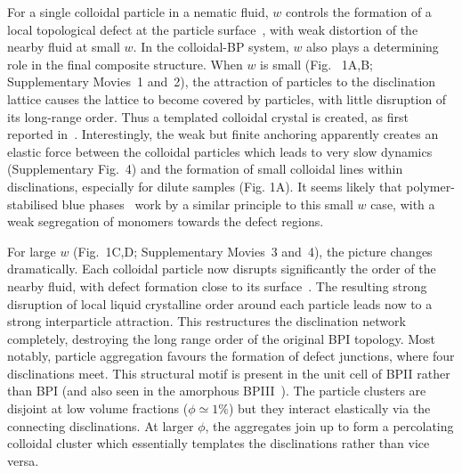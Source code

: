 \documentclass[12pt]{article}
\begin{document}
For a single colloidal particle in a nematic fluid, $w$ controls the formation of a local topological defect at the particle surface~\cite{stark}, with weak distortion of the nearby fluid at small $w$. In the colloidal-BP system, $w$ also plays a determining role in the final composite structure. When $w$ is small (Fig.~ 1A,B; Supplementary Movies~1 and~2), the attraction of particles to the disclination lattice causes
 the lattice to become covered by particles, with little disruption of its
 long-range order. Thus a templated colloidal crystal is created, as first reported in~\cite{miha}. Interestingly, the weak but finite anchoring apparently creates an elastic force between the colloidal particles which leads to very slow dynamics
(Supplementary Fig.~4) and the formation of small colloidal lines within disclinations, especially for dilute samples (Fig. 1A). It seems likely that polymer-stabilised  blue phases~\cite{kikuchi} work by a similar principle to this small $w$ case, with a weak segregation of monomers towards the defect regions.

For large $w$ (Fig.~1C,D; Supplementary Movies~3 and~4), the picture changes
dramatically.
Each colloidal particle now disrupts significantly the order of the nearby fluid, with defect formation close to its surface~\cite{stark}. The resulting strong disruption of local liquid crystalline order around each particle leads now to 
a strong interparticle attraction. This restructures the disclination
network completely, destroying the long range order of
the original BPI topology. Most notably, particle aggregation favours
the formation of defect junctions, where four disclinations meet. This structural motif is present in the unit cell of BPII rather than BPI (and also seen in the amorphous BPIII~\cite{bp3}). The particle clusters are disjoint at low volume fractions ($\phi\simeq 1\%$) but they interact elastically via the connecting disclinations. At larger $\phi$, the aggregates join up to form a percolating colloidal cluster which essentially templates the disclinations rather than vice versa. 
\end{document}
